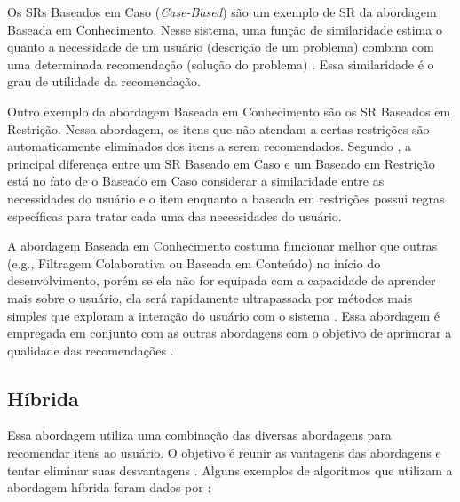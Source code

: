 Os SRs Baseados em Caso (\textit{Case-Based}) são um exemplo de SR da abordagem Baseada em Conhecimento. Nesse sistema, uma
função de similaridade estima o quanto a necessidade de um usuário (descrição de um problema) combina com uma
determinada recomendação (solução do problema) \cite{ricci2011introduction}. Essa similaridade é o grau de utilidade
da recomendação.

Outro exemplo da abordagem Baseada em Conhecimento são os SR Baseados em Restrição. Nessa abordagem, os itens que não
atendam a certas restrições são automaticamente eliminados dos itens a serem recomendados. Segundo
, a principal diferença entre um SR Baseado em Caso e um Baseado em Restrição está
no fato de o Baseado em Caso considerar a similaridade entre as necessidades do usuário e o item enquanto a baseada
em restrições possui regras específicas para tratar cada uma das necessidades do usuário.

A abordagem Baseada em Conhecimento costuma funcionar melhor que outras (e.g., Filtragem Colaborativa ou Baseada em
Conteúdo) no início do desenvolvimento, porém se ela não for equipada com a capacidade de aprender mais sobre o usuário,
ela será rapidamente ultrapassada por métodos mais simples que exploram a interação do usuário com o sistema
\cite{ricci2011introduction}. Essa abordagem é empregada em conjunto com as outras abordagens com o objetivo de aprimorar
a qualidade das recomendações \cite{burke2002hybrid}.

\subsection{Híbrida}

Essa abordagem utiliza uma combinação das diversas abordagens para recomendar itens ao usuário. O objetivo é reunir as
vantagens das abordagens e tentar eliminar suas desvantagens \cite{burke2002hybrid}. Alguns exemplos de algoritmos que
utilizam a abordagem híbrida foram dados por :

